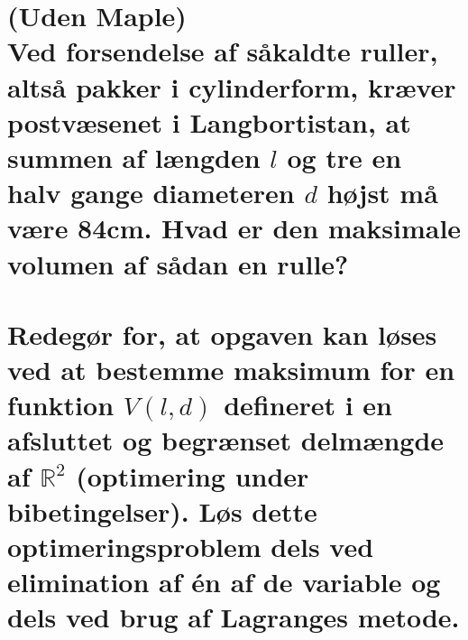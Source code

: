 \documentclass[11pt,a4paper]{article}
\begin{document}
\newpage
\section
{
    \mdseries (Uden Maple) \\
    Ved forsendelse af såkaldte ruller, altså pakker i cylinderform, kræver
    postvæsenet i Langbortistan, at summen af længden $l$ og tre en halv
    gange diameteren $d$ højst må være 84cm. Hvad er den maksimale volumen
    af sådan en rulle?
    \\\\
    Redegør for, at opgaven kan løses ved at bestemme maksimum for en
    funktion $V(l,d)$ defineret i en afsluttet og begrænset delmængde af
    $\mathbb{R}^2$ (optimering under bibetingelser). Løs dette
    optimeringsproblem dels ved elimination af én af de variable og dels ved
    brug af Lagranges metode.
}
\end{document}
